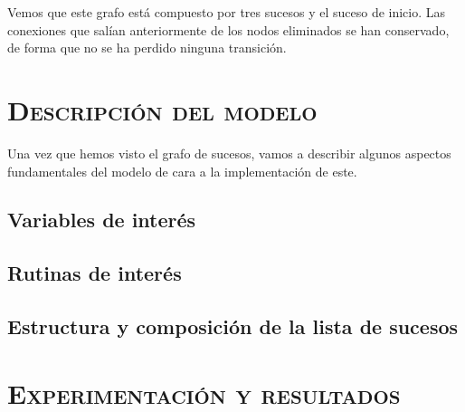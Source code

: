 \documentclass[11pt,a4paper]{article}
\begin{document}
Vemos que este grafo está compuesto por tres sucesos y el suceso de inicio. Las conexiones
que salían anteriormente de los nodos eliminados se han conservado, de forma que no se
ha perdido ninguna transición.

\section{\textsc{Descripción del modelo}}

Una vez que hemos visto el grafo de sucesos, vamos a describir algunos aspectos
fundamentales del modelo de cara a la implementación de este.

\subsection{Variables de interés}

\subsection{Rutinas de interés}

\subsection{Estructura y composición de la lista de sucesos}

\section{\textsc{Experimentación y resultados}}
\end{document}
